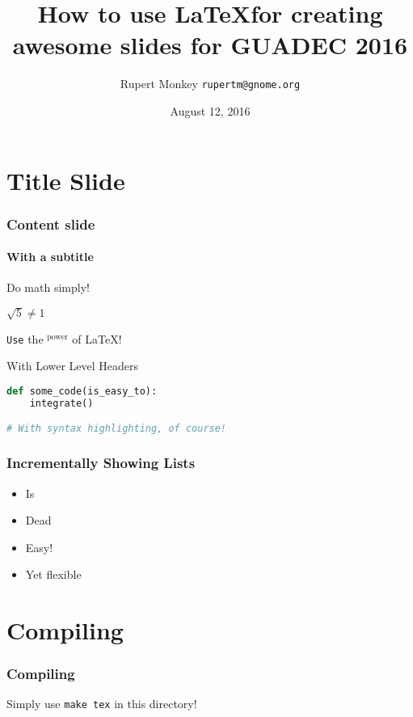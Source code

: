 \documentclass[aspectratio=1610]{beamer}
\title[How to use \LaTeX for GUADEC 2016]{How to use \LaTeX for creating awesome slides for GUADEC 2016}
\author{Rupert Monkey \texttt{rupertm@gnome.org}}
\date{August 12, 2016}
\begin{document}
\begin{frame}
\titlepage
\end{frame}

\section{Title Slide}

\begin{frame}[containsverbatim]
\frametitle{Content slide}
\framesubtitle{With a subtitle}

    Do math simply!

    \begin{center}
        $\sqrt{5} \neq 1$
    \end{center}

    \texttt{Use} the $^\text{power}$ of \LaTeX!

    \begin{block}{With Lower Level Headers}
        \begin{lstlisting}[language=Python]
def some_code(is_easy_to):
    integrate()

# With syntax highlighting, of course!
        \end{lstlisting}
    \end{block}
\end{frame}

\begin{frame}
\frametitle{Incrementally Showing Lists}

    \begin{itemize}
        \item<1-> Is
        \item<2-| alert@2> Dead
        \item<3-> Easy!
        \item<1-> Yet flexible
    \end{itemize}
\end{frame}

\section{Compiling}

\begin{frame}
\frametitle{Compiling}

    Simply use \texttt{make tex} in this directory!
\end{frame}
\end{document}
